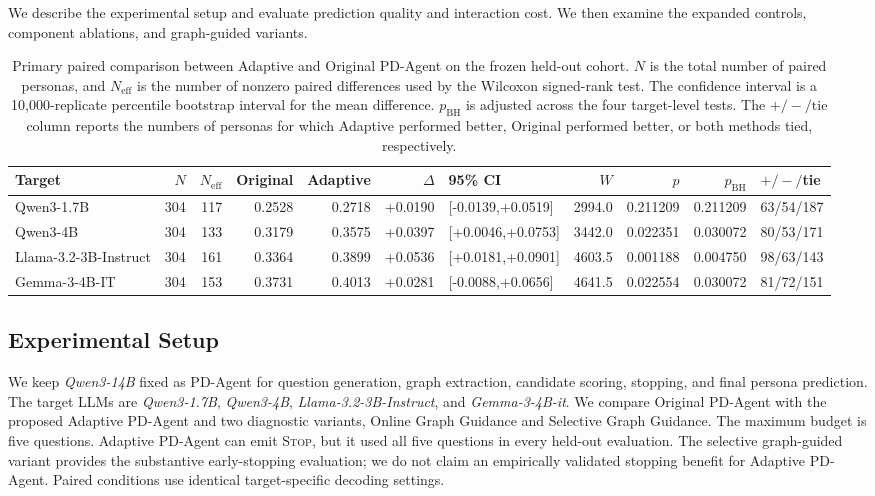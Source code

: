 \documentclass{ieeeaccess}
\begin{document}
We describe the experimental setup and evaluate prediction quality and interaction cost.
We then examine the expanded controls, component ablations, and graph-guided variants.

\begin{table}[t]
\caption{Primary paired comparison between Adaptive and Original PD-Agent on the frozen held-out cohort. $N$ is the total number of paired personas, and $N_{\mathrm{eff}}$ is the number of nonzero paired differences used by the Wilcoxon signed-rank test. The confidence interval is a 10,000-replicate percentile bootstrap interval for the mean difference. $p_{\mathrm{BH}}$ is adjusted across the four target-level tests. The $+/-/\mathrm{tie}$ column reports the numbers of personas for which Adaptive performed better, Original performed better, or both methods tied, respectively.}
\label{tab:primary-paired-statistics}
\centering
\footnotesize
\setlength{\tabcolsep}{3pt}
\begin{tabular*}{\textwidth}{@{\extracolsep{\fill}}lrrrrrlrrrl@{}}
\hline
Target & $N$ & $N_{\mathrm{eff}}$ & Original & Adaptive & $\Delta$ & 95\% CI & $W$ & $p$ & $p_{\mathrm{BH}}$ & $+/-/$tie \\
\hline
Qwen3-1.7B & 304 & 117 & 0.2528 & 0.2718 & +0.0190 & [-0.0139,+0.0519] & 2994.0 & 0.211209 & 0.211209 & 63/54/187 \\
Qwen3-4B & 304 & 133 & 0.3179 & 0.3575 & +0.0397 & [+0.0046,+0.0753] & 3442.0 & 0.022351 & 0.030072 & 80/53/171 \\
Llama-3.2-3B-Instruct & 304 & 161 & 0.3364 & 0.3899 & +0.0536 & [+0.0181,+0.0901] & 4603.5 & 0.001188 & 0.004750 & 98/63/143 \\
Gemma-3-4B-IT & 304 & 153 & 0.3731 & 0.4013 & +0.0281 & [-0.0088,+0.0656] & 4641.5 & 0.022554 & 0.030072 & 81/72/151 \\
\hline
\end{tabular*}
\end{table}

\subsection{Experimental Setup}

We keep \textit{Qwen3-14B} fixed as PD-Agent for question generation, graph extraction,
candidate scoring, stopping, and final persona prediction. The target LLMs are
\textit{Qwen3-1.7B}, \textit{Qwen3-4B}, \textit{Llama-3.2-3B-Instruct}, and
\textit{Gemma-3-4B-it}. We compare Original PD-Agent with the proposed Adaptive PD-Agent and
two diagnostic variants, Online Graph Guidance and Selective Graph Guidance. The maximum
budget is five questions. Adaptive PD-Agent can emit \textsc{Stop}, but it used all five
questions in every held-out evaluation. The selective graph-guided variant provides the
substantive early-stopping evaluation; we do not claim an empirically validated stopping
benefit for Adaptive PD-Agent. Paired conditions use identical target-specific decoding
settings.
\end{document}
